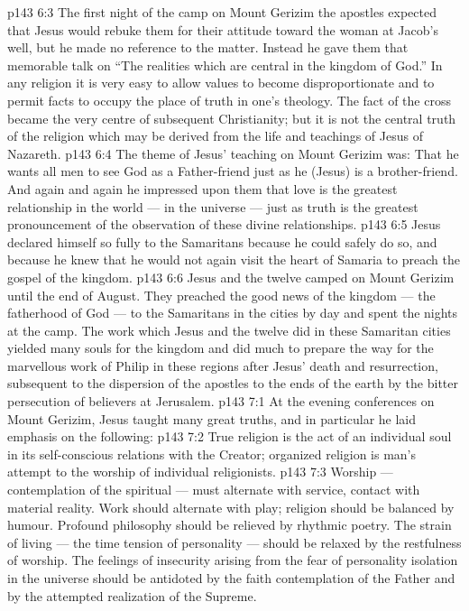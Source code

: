 \vs p143 6:3 \pc The first night of the camp on Mount Gerizim the apostles expected that Jesus would rebuke them for their attitude toward the woman at Jacob’s well, but he made no reference to the matter. Instead he gave them that memorable talk on “The realities which are central in the kingdom of God.” In any religion it is very easy to allow values to become disproportionate and to permit facts to occupy the place of truth in one’s theology. The fact of the cross became the very centre of subsequent Christianity; but it is not the central truth of the religion which may be derived from the life and teachings of Jesus of Nazareth.
\vs p143 6:4 The theme of Jesus’ teaching on Mount Gerizim was: That he wants all men to see God as a Father\hyp{}friend just as he (Jesus) is a brother\hyp{}friend. And again and again he impressed upon them that love is the greatest relationship in the world --- in the universe --- just as truth is the greatest pronouncement of the observation of these divine relationships.
\vs p143 6:5 Jesus declared himself so fully to the Samaritans because he could safely do so, and because he knew that he would not again visit the heart of Samaria to preach the gospel of the kingdom.
\vs p143 6:6 Jesus and the twelve camped on Mount Gerizim until the end of August. They preached the good news of the kingdom --- the fatherhood of God --- to the Samaritans in the cities by day and spent the nights at the camp. The work which Jesus and the twelve did in these Samaritan cities yielded many souls for the kingdom and did much to prepare the way for the marvellous work of Philip in these regions after Jesus’ death and resurrection, subsequent to the dispersion of the apostles to the ends of the earth by the bitter persecution of believers at Jerusalem.
\vs p143 7:1 At the evening conferences on Mount Gerizim, Jesus taught many great truths, and in particular he laid emphasis on the following:
\vs p143 7:2 \pc True religion is the act of an individual soul in its self\hyp{}conscious relations with the Creator; organized religion is man’s attempt to  the worship of individual religionists.
\vs p143 7:3 \pc Worship --- contemplation of the spiritual --- must alternate with service, contact with material reality. Work should alternate with play; religion should be balanced by humour. Profound philosophy should be relieved by rhythmic poetry. The strain of living --- the time tension of personality --- should be relaxed by the restfulness of worship. The feelings of insecurity arising from the fear of personality isolation in the universe should be antidoted by the faith contemplation of the Father and by the attempted realization of the Supreme.
